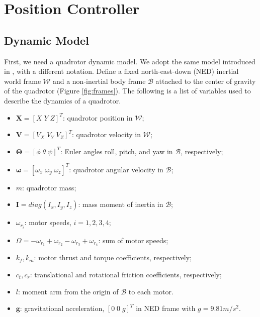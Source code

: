 \documentclass[journal,11pt,onecolumn,draftclsnofoot,]{IEEEtran}
\begin{document}
\section{\textbf{Position Controller}}

\subsection{\textbf{Dynamic Model}} \label{sec:dynamic_model}

First, we need a quadrotor dynamic model. We adopt the same model introduced in \cite{bouadi2011adaptive}, with a different notation. Define a fixed north-east-down (NED) inertial world frame $\mathcal{W}$ and a non-inertial body frame $\mathcal{B}$ attached to the center of gravity of the quadrotor (Figure \ref{fig:frames}). The following is a list of variables used to describe the dynamics of a quadrotor.

\begin{itemize}
	\item $\boldsymbol{X}=[X\; Y\; Z]^T$: quadrotor position in $\mathcal{W}$;
	\item $\boldsymbol{V}=[V_X\; V_Y\; V_Z]^T$: quadrotor velocity in $\mathcal{W}$;
	\item $\boldsymbol{\Theta}=[\phi\; \theta\; \psi]^T$: Euler angles roll, pitch, and yaw in $\mathcal{B}$, respectively;
	\item $\boldsymbol{\omega}=[\omega _x\; \omega _y\; \omega _z]^T$: quadrotor angular velocity in $\mathcal{B}$;
	\item $m$: quadrotor mass;
	\item $\boldsymbol{I}=diag(I_x,I_y,I_z)$: mass moment of inertia in $\mathcal{B}$;
	\item $\omega _{r_i}$: motor speeds, $i=1,2,3,4$;
	\item $\Omega=-\omega _{r_1}+\omega _{r_2}-\omega _{r_3}+\omega _{r_4}$: sum of motor speeds;
	\item $k_f, k_m$: motor thrust and torque coefficients, respectively;
	\item $c_t, c_r$: translational and rotational friction coefficients, respectively;
	\item $l$: moment arm from the origin of $\mathcal{B}$ to each motor.
	\item $\boldsymbol{g}$: gravitational acceleration, $[0 \; 0\; g]^T$  in NED frame with $g=9.81m/s^2$.
\end{itemize}
\end{document}
